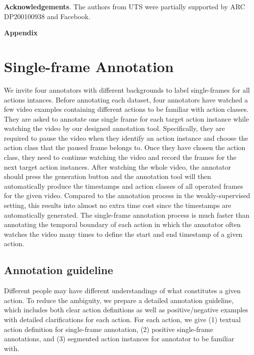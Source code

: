 \documentclass[runningheads]{llncs}
\begin{document}
	\noindent\textbf{Acknowledgements}.
	The authors from UTS were partially supported by ARC DP200100938 and Facebook.


	
	\clearpage

	
	
	\clearpage
	\appendix
	\noindent\textbf{\Large Appendix}
	
	
	
	\section{Single-frame Annotation}
	We invite four annotators with different backgrounds to label single-frames for all actions intances. Before annotating each dataset, four annotators have watched a few video examples containing different actions to be familiar with action classes.
They are asked to annotate one single frame for each target action instance while watching the video by our designed annotation tool.
	Specifically, they are required to pause the video when they identify an action instance and choose the action class that the paused frame belongs to. Once they have chosen the action class, they need to continue watching the video and record the frames for the next target action instances.
	After watching the whole video, the annotator should press the generation button and the annotation tool will then automatically produce the timestamps and action classes of all operated frames for the given video.
	Compared to the annotation process in the weakly-supervised setting, this results into almost no extra time cost since the timestamps are automatically generated.
	The single-frame annotation process is much faster than annotating the temporal boundary of each action in which the annotator often watches the video many times to define the start and end timestamp of a given action. 
	\subsection{Annotation guideline}
	Different people may have different understandings of what constitutes a given action. To reduce the ambiguity, we prepare a detailed annotation guideline, which includes both clear action definitions as well as positive/negative examples with detailed clarifications for each action. 
For each action, we give (1) textual action definition for single-frame annotation, (2) positive single-frame annotations, and (3) segmented action instances for annotator to be familiar with.
	
\end{document}
